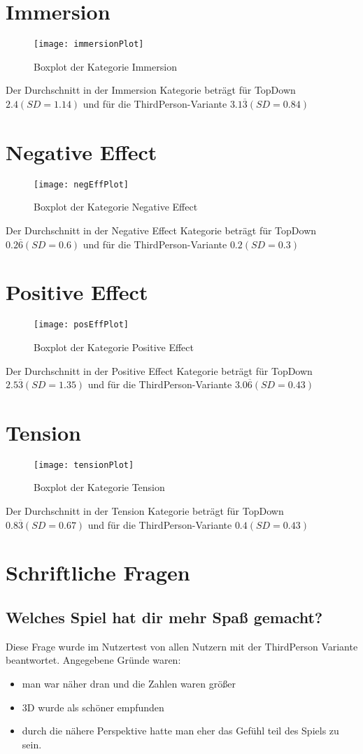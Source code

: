\section{Immersion}
\begin{figure}[h!tb]
	\centering
	\texttt{[image: immersionPlot]}
	\caption{Boxplot der Kategorie Immersion\label{fig:immersionbox}}
\end{figure}
Der Durchschnitt in der Immersion Kategorie beträgt für TopDown  $2.4(SD = 1.14)$ und für die ThirdPerson-Variante $3.1\overline{3}(SD =0.84 )$
\newpage
\section{Negative Effect}
\begin{figure}[h!tb]
	\centering
	\texttt{[image: negEffPlot]}
	\caption{Boxplot der Kategorie Negative Effect\label{fig:negeffbox}}
\end{figure}
Der Durchschnitt in der Negative Effect Kategorie beträgt für TopDown  $0.2\overline{6}(SD = 0.6)$ und für die ThirdPerson-Variante $0.2(SD =0.3 )$
\section{Positive Effect}
\begin{figure}[htb]
	\centering
	\texttt{[image: posEffPlot]}
	\caption{Boxplot der Kategorie Positive Effect\label{fig:poseffbox}}
\end{figure}
Der Durchschnitt in der Positive Effect Kategorie beträgt für TopDown  $2.5\overline{3}(SD = 1.35)$ und für die ThirdPerson-Variante $3.0\overline{6}(SD =0.43 )$
\section{Tension}
\begin{figure}[htb]
	\centering
	\texttt{[image: tensionPlot]}
	\caption{Boxplot der Kategorie Tension\label{fig:tensionbox}}
\end{figure}
Der Durchschnitt in der Tension Kategorie beträgt für TopDown  $0.8\overline{3}(SD = 0.67)$ und für die ThirdPerson-Variante $0.4(SD =0.43 )$
\section{Schriftliche Fragen}
\subsection{Welches Spiel hat dir mehr Spaß gemacht?}
Diese Frage wurde im Nutzertest von allen Nutzern mit der ThirdPerson Variante beantwortet. Angegebene Gründe waren:
\begin{itemize}
\item man war näher dran und die Zahlen waren größer
\item 3D wurde als schöner empfunden
\item durch die nähere Perspektive hatte man eher das Gefühl teil des Spiels zu sein.
\end{itemize}
